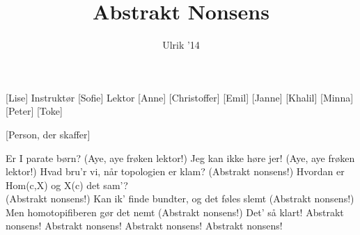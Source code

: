 \documentclass[a4paper,11pt]{article}
\title{Abstrakt Nonsens}
\author{Ulrik '14}
\begin{document}
\maketitle

\begin{roles}
[Lise] Instruktør
[Sofie] Lektor
[Anne]
[Christoffer]
[Emil]
[Janne]
[Khalil]
[Minna]
[Peter]
[Toke]
\end{roles}

\begin{props}
[Person, der skaffer]
\end{props}


\begin{song}
 Er I parate børn?
(Aye, aye frøken lektor!)
Jeg kan ikke høre jer!
(Aye, aye frøken lektor!)
Hvad bru'r vi, når topologien er klam?
(Abstrakt nonsens!)
Hvordan er Hom(c,X) og X(c) det sam'? \\ %
(Abstrakt nonsens!)
Kan ik' finde bundter, og det føles slemt
(Abstrakt nonsens!)
Men homotopifiberen gør det nemt
(Abstrakt nonsens!)
Det' så klart!
Abstrakt nonsens!
Abstrakt nonsens!
Abstrakt nonsens!
Abstrakt nonsens!
\end{song}
\end{document}
